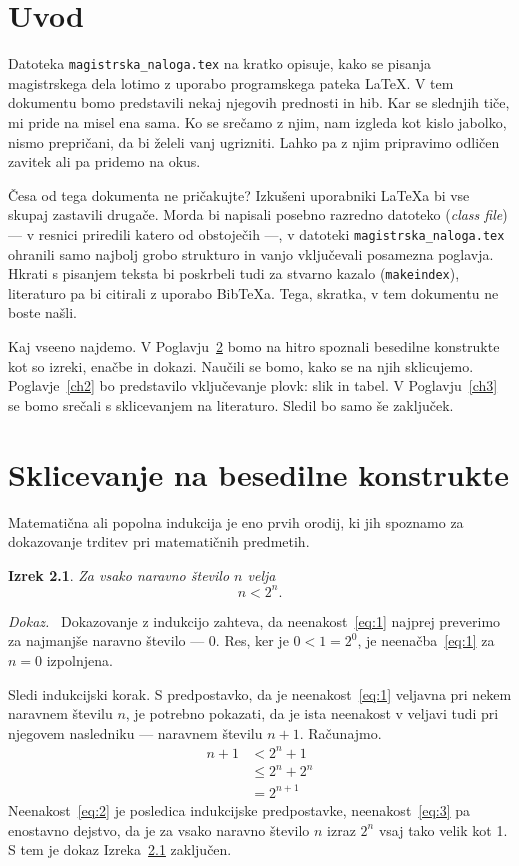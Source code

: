 \documentclass[a4paper, 12pt]{book}
\newcommand{\BibTeX}{{\sc Bib}\TeX}
\newtheorem{izrek}{Izrek}[chapter]
\newenvironment{dokaz}{\emph{Dokaz.}\ }{\hspace{\fill}{$\Box$}}
\begin{document}
\chapter{Uvod}
Datoteka {\tt magistrska\_naloga.tex} na kratko opisuje, kako se pisanja magistrskega dela lotimo z uporabo programskega pateka \LaTeX. V tem dokumentu bomo predstavili nekaj njegovih prednosti in hib. Kar se slednjih tiče, mi pride na misel ena sama. Ko se srečamo z njim, nam izgleda kot kislo jabolko, nismo prepričani, da bi želeli vanj ugrizniti. Lahko pa z njim pripravimo odličen zavitek ali pa pridemo na okus.

Česa od tega dokumenta ne pričakujte? Izkušeni uporabniki \LaTeX{}a bi vse skupaj zastavili
drugače. Morda bi napisali posebno razredno datoteko (\emph{class file}) --- v resnici priredili katero od obstoječih ---, v datoteki {\tt magistrska\_naloga.tex} ohranili samo najbolj grobo strukturo in vanjo vključevali  posamezna po\-glav\-ja. Hkrati s pisanjem teksta bi poskrbeli tudi za stvarno kazalo ({\tt makeindex}), literaturo pa bi citirali z uporabo {\BibTeX}{a}. Tega, skratka, v tem dokumentu ne boste našli.

Kaj vseeno najdemo. V Poglavju~\ref{ch1} bomo na hitro spoznali besedilne konstrukte kot so izreki, enačbe in dokazi. Naučili se bomo, kako se na njih sklicujemo. Poglavje~\ref{ch2} bo predstavilo vključevanje plovk: slik in tabel. V Poglavju~\ref{ch3} se bomo srečali s sklicevanjem na literaturo.
Sledil bo samo še zaključek.

\chapter{Sklicevanje na besedilne konstrukte}
\label{ch1}
Matematična ali popolna indukcija je eno prvih orodij, ki jih spoznamo za dokazovanje trditev pri matematičnih predmetih.
\begin{izrek}
\label{iz:1}
Za vsako naravno število $n$ velja
\begin{equation}
n < 2^n.
\label{eq:1}
\end{equation}
\end{izrek}
\begin{dokaz}
Dokazovanje z indukcijo zahteva, da neenakost~\eqref{eq:1} najprej preverimo za najmanjše naravno število --- $0$. Res, ker je $0 < 1 = 2^0$, je neenačba~\eqref{eq:1} za $n=0$ izpolnjena.

Sledi indukcijski korak. S predpostavko, da je neenakost~\eqref{eq:1} veljavna pri nekem naravnem številu $n$, je potrebno pokazati, da je ista neenakost v veljavi tudi pri njegovem nasledniku --- naravnem številu $n+1$. Računajmo.
\begin{align}
n+1 &< 2^n + 1  \label{eq:2}\\
    &\le 2^n + 2^n \label{eq:3}\\
    &= 2^{n+1} \nonumber
\end{align}
Neenakost~\eqref{eq:2} je posledica indukcijske predpostavke, neenakost~\eqref{eq:3} pa enostavno dejstvo, da je za vsako naravno število $n$ izraz $2^n$ vsaj tako velik kot 1. S tem je dokaz Izreka~\ref{iz:1} zaključen.
\end{dokaz}
\end{document}
